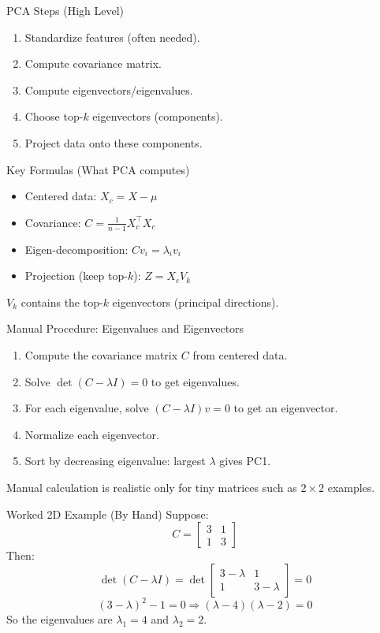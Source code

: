 \documentclass[aspectratio=169]{beamer}
\begin{document}
\begin{frame}{PCA Steps (High Level)}
  \begin{enumerate}[<+->]
    \item Standardize features (often needed).
    \item Compute covariance matrix.
    \item Compute eigenvectors/eigenvalues.
    \item Choose top-$k$ eigenvectors (components).
    \item Project data onto these components.
  \end{enumerate}
\end{frame}

\begin{frame}{Key Formulas (What PCA computes)}
  \begin{itemize}[<+->]
    \item Centered data: $X_c = X - \mu$
    \item Covariance: $C = \frac{1}{n-1} X_c^\top X_c$
    \item Eigen-decomposition: $C v_i = \lambda_i v_i$
    \item Projection (keep top-$k$): $Z = X_c V_k$
  \end{itemize}
  \vspace{0.3em}
  \small $V_k$ contains the top-$k$ eigenvectors (principal directions).
\end{frame}

\begin{frame}{Manual Procedure: Eigenvalues and Eigenvectors}
  \begin{enumerate}[<+->]
    \item Compute the covariance matrix $C$ from centered data.
    \item Solve $\det(C-\lambda I)=0$ to get eigenvalues.
    \item For each eigenvalue, solve $(C-\lambda I)v=0$ to get an eigenvector.
    \item Normalize each eigenvector.
    \item Sort by decreasing eigenvalue: largest $\lambda$ gives PC1.
  \end{enumerate}
  \vspace{0.3em}
  \small Manual calculation is realistic only for tiny matrices such as $2 \times 2$ examples.
\end{frame}

\begin{frame}{Worked 2D Example (By Hand)}
  Suppose:
  \[
    C =
    \begin{bmatrix}
      3 & 1\\
      1 & 3
    \end{bmatrix}
  \]
  Then:
  \[
    \det(C-\lambda I)=
    \det
    \begin{bmatrix}
      3-\lambda & 1\\
      1 & 3-\lambda
    \end{bmatrix}
    = 0
  \]
  \[
    (3-\lambda)^2 - 1 = 0
    \Rightarrow (\lambda-4)(\lambda-2)=0
  \]
  So the eigenvalues are $\lambda_1=4$ and $\lambda_2=2$.
\end{frame}
\end{document}
